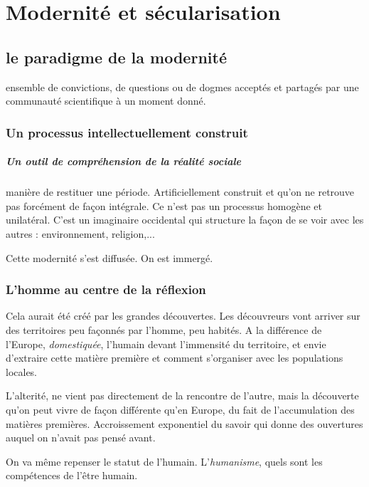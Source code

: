 \chapter{Modernité et sécularisation}

\section{le paradigme de la modernité}

\begin{Def}[Paradigme] ensemble de convictions, de questions ou de dogmes acceptés et partagés par une
communauté scientifique à un moment donné.
\end{Def}

\subsection{Un processus intellectuellement construit}
\paragraph{Un outil de compréhension de la réalité sociale}
manière de restituer  une période. 
Artificiellement construit et qu'on ne retrouve pas forcément de façon intégrale. 
Ce n'est pas un processus homogène et unilatéral.
C'est un imaginaire occidental qui structure la façon de se voir avec les autres : environnement, religion,...

Cette modernité s'est diffusée. On est immergé.


\subsection{L’homme au centre de la réflexion}

Cela aurait été créé par les grandes découvertes. Les découvreurs vont arriver sur des territoires peu façonnés par l'homme, peu habités. A la différence de l'Europe, \textit{domestiquée}, l'humain devant l'immensité du territoire, et envie d'extraire cette matière première et comment s'organiser avec les populations locales.

L'alterité, ne vient pas directement de la rencontre de l'autre, mais la découverte qu'on peut vivre de façon différente qu'en Europe, du fait de l'accumulation des matières premières. Accroissement exponentiel du savoir qui donne des ouvertures auquel on n'avait pas pensé avant.

On va même repenser le statut de l'humain. L'\textit{humanisme}, quels sont les compétences de l'être humain. 

